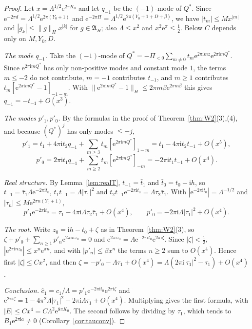 \documentclass[11pt]{amsart}
\theoremstyle{definition}
\newcommand{\eee}{\mathrm{e}}
\newcommand{\ii}{\mathrm{i}}
\begin{document}
\begin{proof}
Let $x=\Lambda^{1/2}\eee^{2\pi K_0}$ and let $q_{-1}$ be the $(-1)$-mode of
$Q^*$.  Since $\eee^{-2\pi d}=\Lambda^{1/2}\eee^{2\pi(Y_0+1)}$ and
$\eee^{-2\pi H}=\Lambda^{1/2}\eee^{2\pi(Y_0+1+D+\beta)}$, we have
$|t_m|\le Mx^{|m|}$ and $|g_k|\le\|g\|_Hx^{|k|}$ for $g\in\mathfrak A_H$;
also $\Lambda\le x^2$ and $x^2\eee^{\pi}\le\tfrac12$.  Below $C$ depends only
on $M,Y_0,D$.

\emph{The mode $q_{-1}$.}  Take the $(-1)$-mode of
$Q^*=-\Pi_{<0}\sum_{m\ne0}t_m\eee^{2\pi\ii mz}\eee^{2\pi\ii mQ^*}$.  Since
$\eee^{2\pi\ii mQ^*}$ has only non-positive modes and constant mode $1$, the
terms $m\le-2$ do not contribute, $m=-1$ contributes $t_{-1}$, and $m\ge1$
contributes $t_m[\eee^{2\pi\ii mQ^*}-1]_{-1-m}$.  With
$\|\eee^{2\pi\ii mQ^*}-1\|_H\le2\pi m\beta\eee^{2\pi m\beta}$ this gives
$q_{-1}=-t_{-1}+O(x^3)$.

\emph{The modes $p'_1,p'_0$.}  By the formulas in the proof of
Theorem~\ref{thm:W2}(3),(4), and because $(Q^*)^j$ has only modes $\le-j$,
\[
 p'_1=t_1+4\pi\ii t_2q_{-1}+\sum_{m\ge3}t_m[\eee^{2\pi\ii mQ^*}]_{1-m}
 =t_1-4\pi\ii t_2t_{-1}+O(x^5),
\]
\[
 p'_0=2\pi\ii t_1q_{-1}+\sum_{m\ge2}t_m[\eee^{2\pi\ii mQ^*}]_{-m}
 =-2\pi\ii t_1t_{-1}+O(x^4).
\]

\emph{Real structure.}  By Lemma~\ref{lem:realT}, $t_{-1}=\bar t_1$ and
$\bar t_0=t_0-\ii h$, so $t_{-1}=\bar\tau_1\Lambda\eee^{-2\pi\ii t_0}$,
$t_1t_{-1}=\Lambda|\tau_1|^2$ and
$t_2t_{-1}\eee^{-2\pi\ii t_0}=\Lambda\tau_2\bar\tau_1$.  With
$|\eee^{-2\pi\ii t_0}|=\Lambda^{-1/2}$ and $|\tau_n|\le M\eee^{2\pi n(Y_0+1)}$,
\[
 p'_1\eee^{-2\pi\ii t_0}=\tau_1-4\pi\ii\Lambda\tau_2\bar\tau_1+O(x^4),\qquad
 p'_0=-2\pi\ii\Lambda|\tau_1|^2+O(x^4).
\]

\emph{The root.}  Write $z_0=\ii h-t_0+\zeta$ as in Theorem~\ref{thm:W2}(3),
so $\zeta+p'_0+\sum_{n\ge1}p'_n\eee^{2\pi\ii nz_0}=0$ and
$\eee^{2\pi\ii z_0}=\Lambda\eee^{-2\pi\ii t_0}\eee^{2\pi\ii\zeta}$.  Since
$|\zeta|<\tfrac12$, $|\eee^{2\pi\ii nz_0}|\le x^n\eee^{\pi n}$, and with
$|p'_n|\le\beta x^n$ the terms $n\ge2$ sum to $O(x^4)$.  Hence first
$|\zeta|\le Cx^2$, and then
$\zeta=-p'_0-\Lambda\tau_1+O(x^4)=\Lambda(2\pi\ii|\tau_1|^2-\tau_1)+O(x^4)$.

\emph{Conclusion.}  $\hat c_1=c_1/\Lambda=p'_1\eee^{-2\pi\ii t_0}\eee^{2\pi\ii\zeta}$
and $\eee^{2\pi\ii\zeta}=1-4\pi^2\Lambda|\tau_1|^2-2\pi\ii\Lambda\tau_1+O(x^4)$.
Multiplying gives the first formula, with $|E|\le Cx^4=C\Lambda^2\eee^{8\pi K_0}$.
The second follows by dividing by $\tau_1$, which tends to
$B_1\eee^{2\pi\ii a}\ne0$ (Corollary~\ref{cor:tauconv}).
\end{proof}
\end{document}
